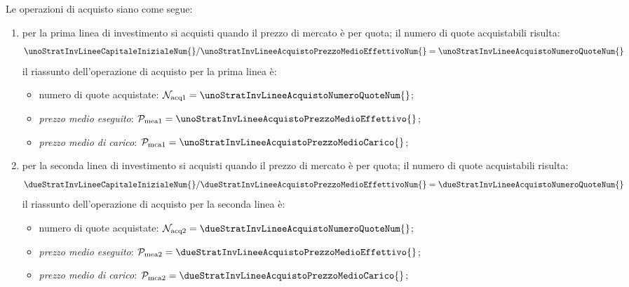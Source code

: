 \documentclass[12pt,a4paper]{article}
\newcommand{\Nacq}[1]{\mathcal{N}_{\textrm{acq}#1}}
\newcommand{\Pmea}[1]{\mathcal{P}_{\mathrm{mea}#1}}
\newcommand{\Pmc}[1]{\mathcal{P}_{\mathrm{mc}#1}}
\newcommand{\Pmca}[1]{\Pmc{\mathrm{a}#1}}
\begin{document}
Le operazioni di acquisto siano come segue:
\begin{enumerate}
\item  per   la  prima  linea  di   investimento  si  acquisti   quando  il  prezzo  di   mercato  è
  \unoStratInvLineeAcquistoPrezzoMedioEffettivo{{}}  per  quota;  il numero  di  quote  acquistabili
  risulta:
  \begin{equation*}
    \unoStratInvLineeCapitaleInizialeNum{} /
    \unoStratInvLineeAcquistoPrezzoMedioEffettivoNum{}
    = \unoStratInvLineeAcquistoNumeroQuoteNum{}
  \end{equation*}
  il riassunto dell'operazione di acquisto per la prima linea è:
  \begin{itemize}
  \item numero di quote acquistate:
    \(\Nacq{1} = \unoStratInvLineeAcquistoNumeroQuoteNum{}\);
  \item \emph{prezzo medio eseguito}:
    \(\Pmea{1} = \unoStratInvLineeAcquistoPrezzoMedioEffettivo{{}}\);
  \item \emph{prezzo medio di carico}:
    \(\Pmca{1} = \unoStratInvLineeAcquistoPrezzoMedioCarico{}\);
  \end{itemize}

\item  per  la  seconda   linea  di  investimento  si  acquisti  quando  il   prezzo  di  mercato  è
  \dueStratInvLineeAcquistoPrezzoMedioEffettivo{{}}  per  quota;  il numero  di  quote  acquistabili
  risulta:
  \begin{equation*}
    \dueStratInvLineeCapitaleInizialeNum{} /
    \dueStratInvLineeAcquistoPrezzoMedioEffettivoNum{}
    = \dueStratInvLineeAcquistoNumeroQuoteNum{}
  \end{equation*}
  il riassunto dell'operazione di acquisto per la seconda linea è:
  \begin{itemize}
  \item numero di quote acquistate:
    \(\Nacq{2} = \dueStratInvLineeAcquistoNumeroQuoteNum{}\);
  \item \emph{prezzo medio eseguito}:
    \(\Pmea{2} = \dueStratInvLineeAcquistoPrezzoMedioEffettivo{{}}\);
  \item \emph{prezzo medio di carico}:
    \(\Pmca{2} = \dueStratInvLineeAcquistoPrezzoMedioCarico{}\);
  \end{itemize}


\end{enumerate}
\end{document}
